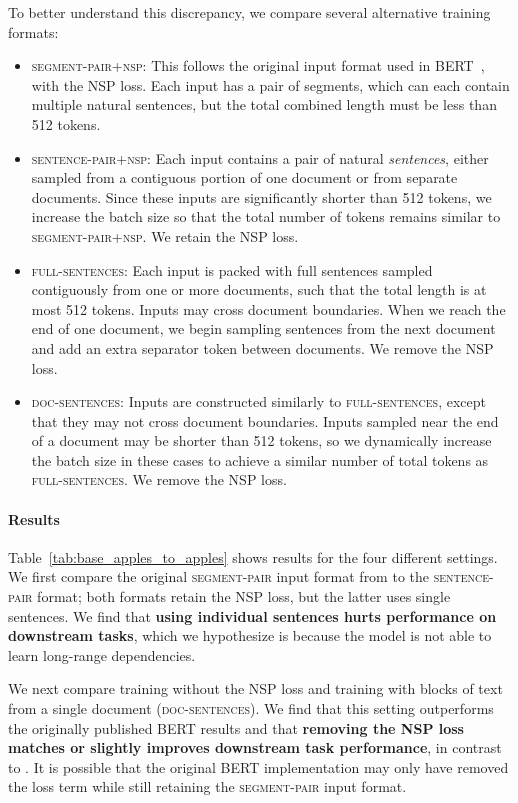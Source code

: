 \documentclass[11pt]{article}
\newcommand{\bertbase}{BERT}
\begin{document}
To better understand this discrepancy, we compare several alternative training formats:
\begin{itemize}[leftmargin=*]
\setlength\itemsep{0em}
\item \textsc{segment-pair+nsp}: This follows the original input format used in BERT~\cite{devlin2018bert}, with the NSP loss. Each input has a pair of segments, which can each contain multiple natural sentences, but the total combined length must be less than 512 tokens.
\item \textsc{sentence-pair+nsp}: Each input contains a pair of natural \emph{sentences}, either sampled from a contiguous portion of one document or from separate documents. Since these inputs are significantly shorter than 512 tokens, we increase the batch size so that the total number of tokens remains similar to \textsc{segment-pair+nsp}. We retain the NSP loss.
\item \textsc{full-sentences}: Each input is packed with full sentences sampled contiguously from one or more documents, such that the total length is at most 512 tokens. Inputs may cross document boundaries. When we reach the end of one document, we begin sampling sentences from the next document and add an extra separator token between documents. We remove the NSP loss.
\item \textsc{doc-sentences}: Inputs are constructed similarly to \textsc{full-sentences}, except that they may not cross document boundaries. Inputs sampled near the end of a document may be shorter than 512 tokens, so we dynamically increase the batch size in these cases to achieve a similar number of total tokens as \textsc{full-sentences}. We remove the NSP loss.
\end{itemize}

\paragraph{Results}

Table~\ref{tab:base_apples_to_apples} shows results for the four different settings.
We first compare the original \textsc{segment-pair} input format from  to the \textsc{sentence-pair} format; both formats retain the NSP loss, but the latter uses single sentences.
We find that \textbf{using individual sentences hurts performance on downstream tasks}, which we hypothesize is because the model is not able to learn long-range dependencies.

We next compare training without the NSP loss and training with blocks of text from a single document (\textsc{doc-sentences}).
We find that this setting outperforms the originally published \bertbase{} results and that \textbf{removing the NSP loss matches or slightly improves downstream task performance}, in contrast to .
It is possible that the original BERT implementation may only have removed the loss term while still retaining the \textsc{segment-pair} input format.
\end{document}
